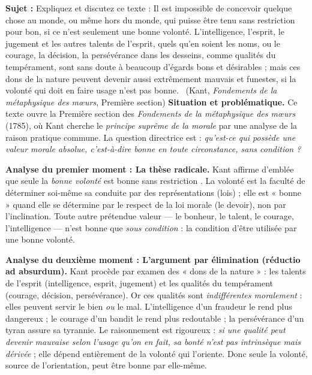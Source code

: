 \documentclass[11pt]{article}
\begin{document}
\begin{exoresolu}
\textbf{Sujet :} Expliquez et discutez ce texte : \guillemotleft Il est impossible de concevoir quelque chose au monde, ou même hors du monde, qui puisse être tenu sans restriction pour bon, si ce n'est seulement une bonne volonté. L'intelligence, l'esprit, le jugement et les autres talents de l'esprit, quels qu'en soient les noms, ou le courage, la décision, la persévérance dans les desseins, comme qualités du tempérament, sont sans doute à beaucoup d'égards bons et désirables ; mais ces dons de la nature peuvent devenir aussi extrêmement mauvais et funestes, si la volonté qui doit en faire usage n'est pas bonne. \guillemotright\ (Kant, \emph{Fondements de la métaphysique des mœurs}, Première section)
\tcblower
\textbf{Situation et problématique.} Ce texte ouvre la Première section des \emph{Fondements de la métaphysique des mœurs} (1785), où Kant cherche le \emph{principe suprême de la morale} par une analyse de la raison pratique commune. La question directrice est : \emph{qu'est-ce qui possède une valeur morale absolue, c'est-à-dire bonne en toute circonstance, sans condition ?}

\textbf{Analyse du premier moment : La thèse radicale.} Kant affirme d'emblée que seule la \emph{bonne volonté} est bonne \guillemotleft sans restriction \guillemotright. La volonté est la faculté de déterminer soi-même sa conduite par des représentations (lois) ; elle est « bonne » quand elle se détermine par le respect de la loi morale (le devoir), non par l'inclination. Toute autre prétendue valeur — le bonheur, le talent, le courage, l'intelligence — n'est bonne que \emph{sous condition} : la condition d'être utilisée par une bonne volonté.

\textbf{Analyse du deuxième moment : L'argument par élimination (réductio ad absurdum).} Kant procède par examen des « dons de la nature » : les talents de l'esprit (intelligence, esprit, jugement) et les qualités du tempérament (courage, décision, persévérance). Or ces qualités sont \emph{indifférentes moralement} : elles peuvent servir le bien \emph{ou} le mal. L'intelligence d'un fraudeur le rend plus dangereux ; le courage d'un bandit le rend plus redoutable ; la persévérance d'un tyran assure sa tyrannie. Le raisonnement est rigoureux : \emph{si une qualité peut devenir mauvaise selon l'usage qu'on en fait, sa bonté n'est pas intrinsèque mais dérivée} ; elle dépend entièrement de la volonté qui l'oriente. Donc seule la volonté, source de l'orientation, peut être bonne par elle-même.


\end{exoresolu}
\end{document}
